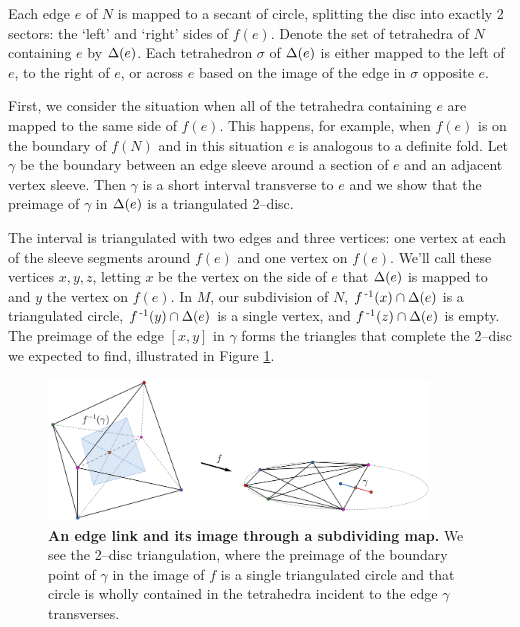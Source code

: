 Each edge $e$ of $N$ is mapped to a secant of circle, splitting the disc into exactly 2 sectors: the `left' and `right' sides of $f(e)$.
Denote the set of tetrahedra of $N$ containing $e$ by $\Delta(e)$.
Each tetrahedron $\sigma$ of  $\Delta(e)$ is either mapped to the left of $e$, to the right of $e$, or across $e$ based on the image of the edge in $\sigma$ opposite $e$.

First, we consider the situation when all of the tetrahedra containing $e$ are mapped to the same side of $f(e)$.
This happens, for example, when $f(e)$ is on the boundary of $f(N)$ and in this situation $e$ is analogous to a definite fold.
Let $\gamma$ be the boundary between an edge sleeve around a section of $e$ and an adjacent vertex sleeve.
Then $\gamma$ is a short interval transverse to $e$ and we show that the preimage of $\gamma$ in $\Delta(e)$ is a triangulated 2--disc.

The interval is triangulated with two edges and three vertices: one vertex at each of the sleeve segments around $f(e)$ and one vertex on $f(e)$.
We'll call these vertices $x,y,z$, letting $x$ be the vertex on the side of $e$ that $\Delta(e)$ is mapped to and $y$ the vertex on $f(e)$.
In $M$, our subdivision of $N$, $f^{\,\text{-}1}(x)\cap\Delta(e)$ is a triangulated circle, $f^{\,\text{-}1}(y)\cap\Delta(e)$ is a single vertex, and $f^{\,\text{-}1}(z)\cap\Delta(e)$ is empty.
The preimage of the edge $[x,y]$ in $\gamma$ forms the triangles that complete the 2--disc we expected to find, illustrated in Figure \ref{fig:pl-definite-fold}.

\begin{figure}[h!]
	\centering
	\includegraphics[width=0.9\textwidth]{figures/pl-definite-fold.png}
	\caption{
		\textbf{An edge link and its image through a subdividing map.}
		We see the 2--disc triangulation, where the preimage of the boundary point of $\gamma$ in the image of $f$ is a single triangulated circle and that circle is wholly contained in the tetrahedra incident to the edge $\gamma$ transverses.
	}
	\label{fig:pl-definite-fold}
\end{figure}

